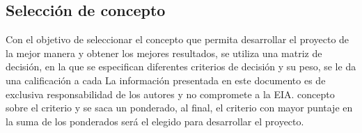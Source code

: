 \subsection{Selección de concepto}
Con el objetivo de seleccionar el concepto que permita desarrollar el proyecto de la mejor
manera y obtener los mejores resultados, se utiliza una matriz de decisión, en la que se
especifican diferentes criterios de decisión y su peso, se le da una calificación a cada 
La información presentada en este documento es de exclusiva responsabilidad de los autores y no
compromete a la EIA.
concepto sobre el criterio y se saca un ponderado, al final, el criterio con mayor puntaje en
la suma de los ponderados será el elegido para desarrollar el proyecto.
\begin{table}[H]
	\centering
	\caption{Matriz de desición Empacador Flor}
\end{table}
